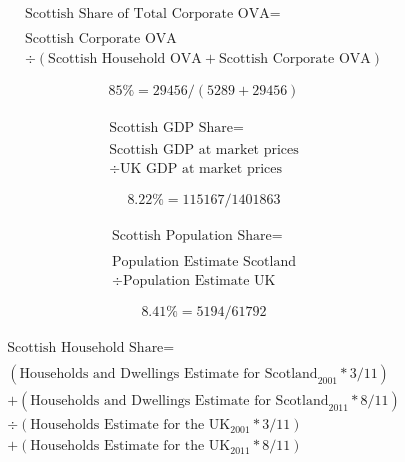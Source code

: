 \begin{enumerate}
\begin{equation}
\begin{split}
\text{Scottish Share of Total Corporate OVA} =  \\ \\
\text{Scottish Corporate OVA}\\ 
\div (\text{Scottish Household OVA}+ \text{Scottish Corporate OVA}) 
\end{split} \label{eq:2.5.84}
\end{equation}

\begin{equation} \nonumber
85\% = 29456/(5289+29456)
\end{equation}\\


\begin{equation}
\begin{split}
\text{Scottish GDP Share} =  \\ \\
\text{Scottish GDP at market prices}\\ 
\div \text{UK GDP at market prices} 
\end{split} \label{eq:2.5.85}
\end{equation}

\begin{equation} \nonumber
8.22\% = 115167/1401863
\end{equation}\\


\begin{equation}
\begin{split}
\text{Scottish Population Share} =  \\ \\
\text{Population Estimate Scotland}\\ 
\div \text{Population Estimate UK} 
\end{split} \label{eq:2.5.86}
\end{equation}

\begin{equation} \nonumber
8.41\% = 5194/61792
\end{equation}\\


\begin{equation}
\begin{split}
\text{Scottish Household Share} =  \\ \\
(\text{Households and Dwellings Estimate for Scotland}_\text{2001}*3/11)\\
+(\text{Households and Dwellings Estimate for Scotland}_\text{2011}*8/11)\\ 
\div (\text{Households Estimate for the UK}_\text{2001}*3/11)\\
+(\text{Households Estimate for the UK}_\text{2011}*8/11)\\ 
\end{split} \label{eq:2.5.87}
\end{equation}


\end{enumerate}
